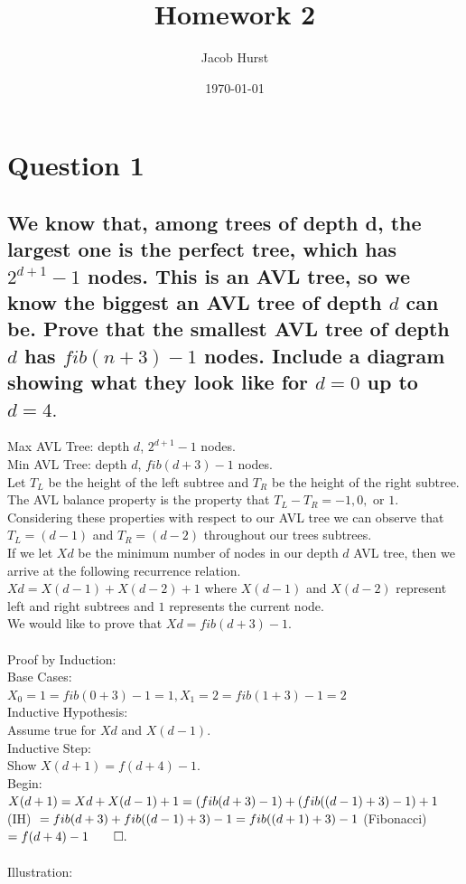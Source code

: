 \documentclass[11pt]{article}
\title{ Homework 2 }
\author{ Jacob Hurst }
\date{\today}
\begin{document}
\maketitle
\clearpage

\section{Question 1}
\subsection{We know that, among trees of depth d, the largest one is the perfect tree, which has $ 2^{d+1} - 1 $ nodes. This is an AVL tree, so we know the biggest an AVL tree of depth $ d $ can be. Prove that the smallest AVL tree of depth $ d $ has $ fib(n+3) - 1 $ nodes.  Include a diagram showing what they look like for $ d = 0 $ up to $ d = 4. $ }

Max AVL Tree: depth $d$, $2^{d+1}-1$ nodes. \\Min AVL Tree: depth $d$, $fib(d+3)-1$ nodes. \\Let $T_L$ be the height of the left subtree and $T_R$ be the height of the right subtree. \\The AVL balance property is the property that $T_L - T_R = -1, 0, $ or $ 1$. \\Considering these properties with respect to our AVL tree we can observe that $T_L = (d-1)$ and $T_R = (d-2)$ throughout our trees subtrees. \\If we let $Xd$ be the minimum number of nodes in our depth $d$ AVL tree, then we arrive at the following recurrence relation. \\$Xd = X(d-1) + X(d-2) + 1$ where $X(d-1)$ and $X(d-2)$ represent left and right subtrees and $1$ represents the current node. \\We would like to prove that $Xd = fib(d+3) - 1$.
\\
\\
Proof by Induction:\\
Base Cases: \\$X_0 = 1 = fib(0+3) - 1 = 1, X_1 = 2 = fib(1+3) - 1 = 2$\\
Inductive Hypothesis: \\Assume true for $Xd$ and $X(d-1)$.\\
Inductive Step: \\Show $X(d+1) = f(d+4) - 1$.\\
Begin:\\
$
X(d+1) = Xd + X(d-1) + 1 \\= (fib(d+3) - 1) + (fib((d-1)+3) - 1) + 1
$ (IH) $ \\= fib(d+3) + fib((d-1)+3) - 1 = fib((d+1)+3) - 1 $ (Fibonacci) $ = f(d+4) - 1 \qed.$ \\\\Illustration:
\end{document}

